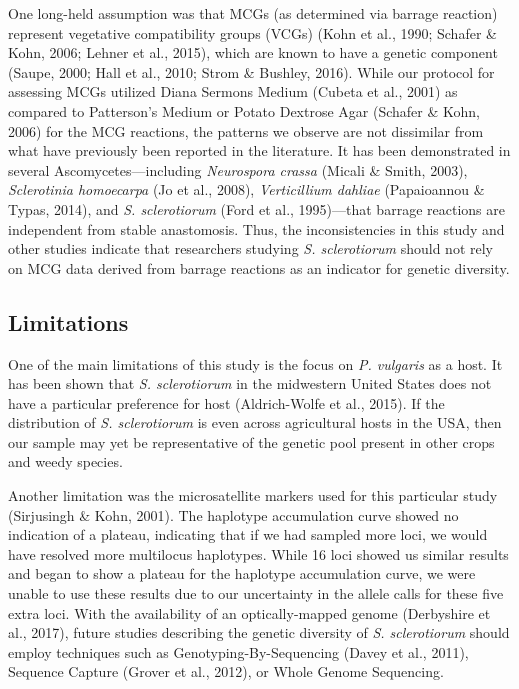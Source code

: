 \documentclass[fleqn,10pt,lineno]{wlpeerj} %
\theoremstyle{definition}
\theoremstyle{definition}
\theoremstyle{definition}
\theoremstyle{remark}
\begin{document}
One long-held assumption was that MCGs (as determined via barrage
reaction) represent vegetative compatibility groups (VCGs) (Kohn et al.,
1990; Schafer \& Kohn, 2006; Lehner et al., 2015), which are known to
have a genetic component (Saupe, 2000; Hall et al., 2010; Strom \&
Bushley, 2016). While our protocol for assessing MCGs utilized Diana
Sermons Medium (Cubeta et al., 2001) as compared to Patterson's Medium
or Potato Dextrose Agar (Schafer \& Kohn, 2006) for the MCG reactions,
the patterns we observe are not dissimilar from what have previously
been reported in the literature. It has been demonstrated in several
Ascomycetes---including \emph{Neurospora crassa} (Micali \& Smith,
2003), \emph{Sclerotinia homoecarpa} (Jo et al., 2008),
\emph{Verticillium dahliae} (Papaioannou \& Typas, 2014), and \emph{S.
sclerotiorum} (Ford et al., 1995)---that barrage reactions are
independent from stable anastomosis. Thus, the inconsistencies in this
study and other studies indicate that researchers studying \emph{S.
sclerotiorum} should not rely on MCG data derived from barrage reactions
as an indicator for genetic diversity.

\subsection*{Limitations}\label{limitations}

One of the main limitations of this study is the focus on \emph{P.
vulgaris} as a host. It has been shown that \emph{S. sclerotiorum} in
the midwestern United States does not have a particular preference for
host (Aldrich-Wolfe et al., 2015). If the distribution of \emph{S.
sclerotiorum} is even across agricultural hosts in the USA, then our
sample may yet be representative of the genetic pool present in other
crops and weedy species.

Another limitation was the microsatellite markers used for this
particular study (Sirjusingh \& Kohn, 2001). The haplotype accumulation
curve showed no indication of a plateau, indicating that if we had
sampled more loci, we would have resolved more multilocus haplotypes.
While 16 loci showed us similar results and began to show a plateau for
the haplotype accumulation curve, we were unable to use these results
due to our uncertainty in the allele calls for these five extra loci.
With the availability of an optically-mapped genome (Derbyshire et al.,
2017), future studies describing the genetic diversity of \emph{S.
sclerotiorum} should employ techniques such as Genotyping-By-Sequencing
(Davey et al., 2011), Sequence Capture (Grover et al., 2012), or Whole
Genome Sequencing.
\end{document}
